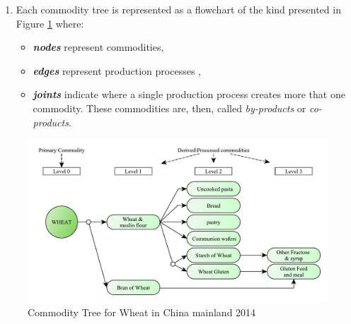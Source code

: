 \documentclass[]{article}
\providecommand{\tightlist}{%
  \setlength{\itemsep}{0pt}\setlength{\parskip}{0pt}}
\begin{document}
\begin{enumerate}
\def\labelenumi{\arabic{enumi}.}
\tightlist
\item
  Each commodity tree is represented as a flowchart of the kind
  presented in Figure \ref{fig:f2} where:

  \begin{itemize}
  \tightlist
  \item
    \textbf{\emph{nodes}} represent commodities,
  \item
    \textbf{\emph{edges}} represent production processes ,
  \item
    \textbf{\emph{joints}} indicate where a single production process
    creates more that one commodity. These commodities are, then, called
    \emph{by-products} or \emph{co-products}.
  \end{itemize}
\end{enumerate}

\begin{figure}[H]

{\centering \includegraphics{images/StandBal/02_WheatTree} 

}

\caption{\label{fig:f2}Commodity Tree for Wheat in China mainland 2014}\label{fig:f2}
\end{figure}
\end{document}
